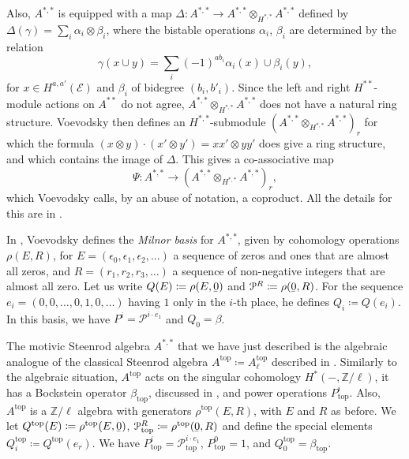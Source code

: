 \documentclass[10pt]{amsart}
\theoremstyle{definition}
\theoremstyle{plain}
\numberwithin{equation}{section}
\newcommand{\0}{\emptyset}
\newcommand{\sE}{{\mathcal E}}
\newcommand{\Z}{{\mathbb Z}}
\renewcommand{\top}{{\operatorname{top}}}
\begin{document}
Also, $A^{*,*}$ is equipped with a map $\Delta: A^{*,*} \to A^{*,*} \otimes_{H^{*,*}} A^{*,*}$ defined by
$\Delta (\gamma)= \sum_i \alpha_i \otimes \beta_i$, where the bistable operations $\alpha_i$, $\beta_i$ are determined by the relation
$$\gamma(x \cup y)= \sum_i(-1)^{ab_i} \alpha_i(x) \cup \beta_i(y),$$
for $x\in H^{a,a'}(\sE)$ and $\beta_i$ of bidegree $(b_i,b'_i)$. Since the left and right $H^{**}$-module actions on $A^{**}$ do not agree, $A^{*,*} \otimes_{H^{*,*}} A^{*,*}$ does not have a natural ring structure. Voevodsky then defines an $H^{*,*}$-submodule $(A^{*,*} \otimes_{H^{*,*}} A^{*,*})_r$ for which the formula $(x\otimes y)\cdot (x'\otimes y')=xx'\otimes yy'$ does give a ring structure, and which contains the image of $\Delta$. This gives a co-associative map 
\begin{equation}\label{eqn:ACoproduct}
\Psi:A^{*,*}\to (A^{*,*} \otimes_{H^{*,*}} A^{*,*})_r, 
\end{equation}
which Voevodsky calls, by an abuse of notation, a coproduct. All the details for this are in \cite[Lemmas 11.6-11.9]{Voev-power}.


In \cite[Section 13]{Voev-power}, Voevodsky defines the \emph{Milnor basis} for $A^{*,*}$, given by cohomology operations $\rho(E,R)$, for $E=(\epsilon_0, \epsilon_1, \epsilon_2, \ldots)$ a sequence of zeros and ones that are almost all zeros, and $R=(r_1, r_2, r_3, \ldots)$ a sequence of non-negative integers that are almost all zero. Let us write $Q(E) \coloneqq \rho(E, \underaccent{\bar}{0})$ and $\mathcal{P}^R \coloneqq \rho(\underaccent{\bar}{0},R)$. For the sequence $e_i=(0,0, \ldots, 0,1,0, \ldots)$ having $1$ only in the $i$-th place, he defines $Q_i\coloneqq Q(e_i)$. In this basis, we have $P^i = \mathcal{P}^{i\cdot e_1}$ and $Q_0 = \beta$.

The motivic Steenrod algebra $A^{*,*}$ that we have just described is the algebraic analogue of the classical Steenrod algebra $A^{\text{top}} \coloneqq A^{\top}_{\ell}$ described in \cite{mil:Steenrod}. Similarly to the algebraic situation, $A^{\text{top}}$ acts on the singular cohomology $H^*(-,\Z/\ell)$, it has a Bockstein operator $\beta_{\top}$, discussed in \cite[Chapter IV]{steenrod:cohomology}, and power operations $P^i_{\top}$. Also, $A^{\top}$ is a $\Z/\ell$ algebra with generators $\rho^{\top}(E,R)$, with $E$ and $R$ as before. We let $Q^{\top}(E) \coloneqq \rho^{\top}(E, \underaccent{\bar}{0})$, $\mathcal{P}_{\top}^R \coloneqq \rho^{\top}(\underaccent{\bar}{0},R)$ and define the special elements $Q_i^{\top} \coloneqq Q^{\top}(e_r)$. We have $P^i_{\top}=\mathcal{P}^{i \cdot e_1}_{\top}$, $P_{\top}^0=1$, and $Q_0^{\top}=\beta_{\top}$.
\end{document}
